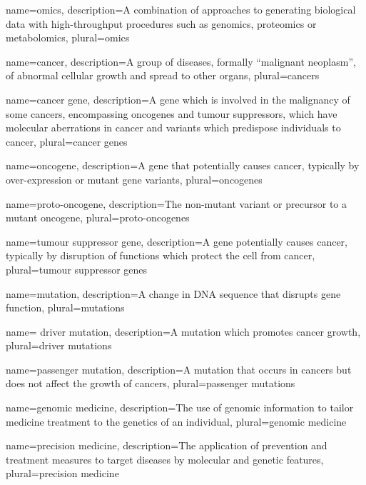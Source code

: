 {
  name=omics,
  description={A combination of approaches to generating biological data with high-throughput procedures such as genomics, proteomics or metabolomics},
  plural=omics
}

{
  name=cancer,
  description={A group of diseases, formally ``malignant neoplasm'', of abnormal cellular growth and spread to other organs},
  plural=cancers
}

{
  name=cancer gene,
  description={A gene which is involved in the malignancy of some cancers, encompassing \glspl{oncogene} and \glspl{tumour suppressor}, which have molecular aberrations in cancer and variants which predispose individuals to cancer},
  plural=cancer genes
}

{
  name=oncogene,
  description={A gene that potentially causes cancer, typically by over-expression or mutant gene variants},
  plural=oncogenes
}

{
  name=proto-oncogene,
  description={The non-mutant variant or precursor to a mutant \gls{oncogene}},
  plural=proto-oncogenes
}

{
  name=tumour suppressor gene,
  description={A gene potentially causes cancer, typically by disruption of functions which protect the cell from cancer},
  plural=tumour suppressor genes
}

{
  name=mutation,
  description={A change in DNA sequence that disrupts gene function},
  plural=mutations
}

{
  name= driver mutation,
  description={A \gls{mutation} which promotes cancer growth},
  plural=driver mutations
}

{
  name=passenger mutation,
  description={A \gls{mutation} that occurs in cancers but does not affect the growth of cancers},
  plural=passenger mutations
}

{
  name=genomic medicine,
  description={The use of genomic information to tailor medicine treatment to the genetics of an individual},
  plural=genomic medicine
}

{
  name=precision medicine,
  description={The application of prevention and treatment measures to target diseases by molecular and genetic features},
  plural=precision medicine
}

